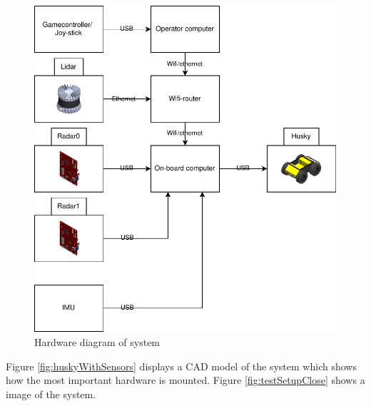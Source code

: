 \begin{figure}[H]
    \centering
    \includegraphics[scale=1]{Figures/draw.io/hardwareBlockDiagram.drawio.pdf}
    \caption{Hardware diagram of system}
    \label{fig:HWdiagram}
\end{figure}
Figure \ref{fig:huskyWithSensors} displays a CAD model of the system which shows how the most important hardware is mounted. Figure \ref{fig:testSetupClose} shows a image of the system.
